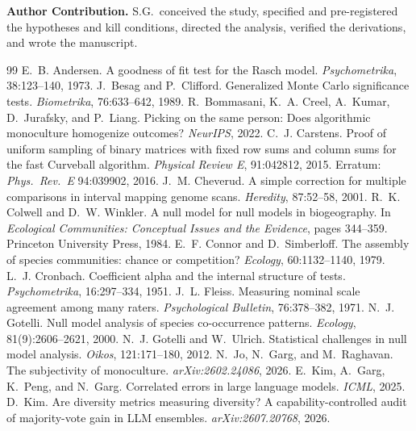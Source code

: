\documentclass[pdflatex,sn-mathphys-ay]{sn-jnl}
\theoremstyle{thmstyleone}
\theoremstyle{thmstylethree}
\begin{document}
\textbf{Author Contribution.} S.G.\ conceived the study, specified and pre-registered the
hypotheses and kill conditions, directed the analysis, verified the derivations, and wrote the
manuscript.
\begin{thebibliography}{99}
\small
{} E.~B. Andersen. A goodness of fit test for the Rasch model. \emph{Psychometrika}, 38:123--140, 1973.
 J.~Besag and P.~Clifford. Generalized Monte Carlo significance tests. \emph{Biometrika}, 76:633--642, 1989.
 R.~Bommasani, K.~A. Creel, A.~Kumar, D.~Jurafsky, and P.~Liang. Picking on the same person: Does algorithmic monoculture homogenize outcomes? \emph{NeurIPS}, 2022.
 C.~J. Carstens. Proof of uniform sampling of binary matrices with fixed row sums and column sums for the fast Curveball algorithm. \emph{Physical Review E}, 91:042812, 2015. Erratum: \emph{Phys.\ Rev.\ E} 94:039902, 2016.
 J.~M. Cheverud. A simple correction for multiple comparisons in interval mapping genome scans. \emph{Heredity}, 87:52--58, 2001.
 R.~K. Colwell and D.~W. Winkler. A null model for null models in biogeography. In \emph{Ecological Communities: Conceptual Issues and the Evidence}, pages 344--359. Princeton University Press, 1984.
 E.~F. Connor and D.~Simberloff. The assembly of species communities: chance or competition? \emph{Ecology}, 60:1132--1140, 1979.
 L.~J. Cronbach. Coefficient alpha and the internal structure of tests. \emph{Psychometrika}, 16:297--334, 1951.
 J.~L. Fleiss. Measuring nominal scale agreement among many raters. \emph{Psychological Bulletin}, 76:378--382, 1971.
 N.~J. Gotelli. Null model analysis of species co-occurrence patterns. \emph{Ecology}, 81(9):2606--2621, 2000.
 N.~J. Gotelli and W.~Ulrich. Statistical challenges in null model analysis. \emph{Oikos}, 121:171--180, 2012.
 N.~Jo, N.~Garg, and M.~Raghavan. The subjectivity of monoculture. \emph{arXiv:2602.24086}, 2026.
 E.~Kim, A.~Garg, K.~Peng, and N.~Garg. Correlated errors in large language models. \emph{ICML}, 2025.
 D.~Kim. Are diversity metrics measuring diversity? A capability-controlled audit of majority-vote gain in LLM ensembles. \emph{arXiv:2607.20768}, 2026.

\end{thebibliography}
\end{document}
